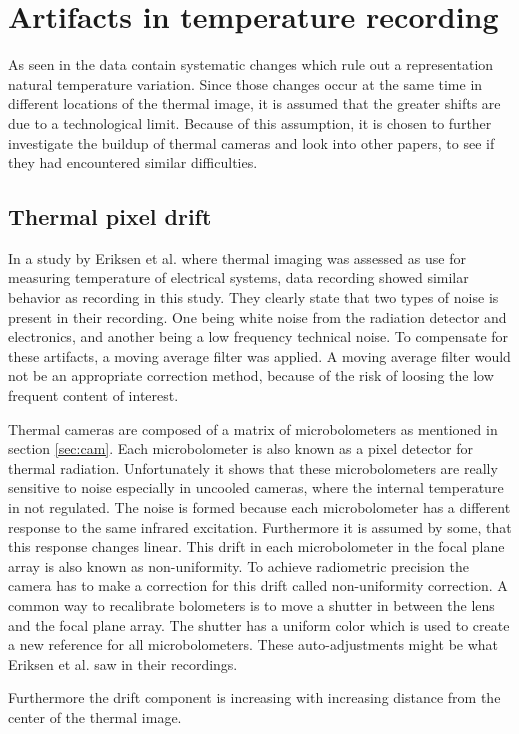 \section{Artifacts in temperature recording}
\label{sec:artifacts}
As seen in  the data contain systematic changes which rule out a representation natural temperature variation. Since those changes occur at the same time in different locations of the thermal image, it is assumed that the greater shifts are due to a technological limit. Because of this assumption, it is chosen to further investigate the buildup of thermal cameras and look into other papers, to see if they had encountered similar difficulties.

\subsection{Thermal pixel drift}

In a study by Eriksen et al. where thermal imaging was assessed as use for measuring temperature of electrical systems, data recording showed similar behavior as recording in this study. They clearly state that two types of noise is present in their recording. One being white noise from the radiation detector and electronics, and another being a low frequency technical noise. To compensate for these artifacts, a moving average filter was applied.\cite{eriksen2014} A moving average filter would not be an appropriate correction method, because of the risk of loosing the low frequent content of interest. 


Thermal cameras are composed of a matrix of microbolometers as mentioned in section \cref{sec:cam}. Each microbolometer is also known as a pixel detector for thermal radiation.\cite{olbrycht2015,wolf2016} Unfortunately it shows that these microbolometers are really sensitive to noise especially in uncooled cameras, where the internal temperature in not regulated. The noise is formed because each microbolometer has a different response to the same infrared excitation. Furthermore it is assumed by some, that this response changes linear\cite{olbrycht2015}. This drift in each microbolometer in the focal plane array is also known as non-uniformity. To achieve radiometric precision the camera has to make a correction for this drift called non-uniformity correction. A common way to recalibrate bolometers is to move a shutter in between the lens and the focal plane array. The shutter has a uniform color which is used to create a new reference for all microbolometers.\cite{olbrycht2015,wolf2016} These auto-adjustments might be what Eriksen et al. saw in their recordings.

Furthermore the drift component is increasing with increasing distance from the center of the thermal image.\cite{olbrycht2015} 




